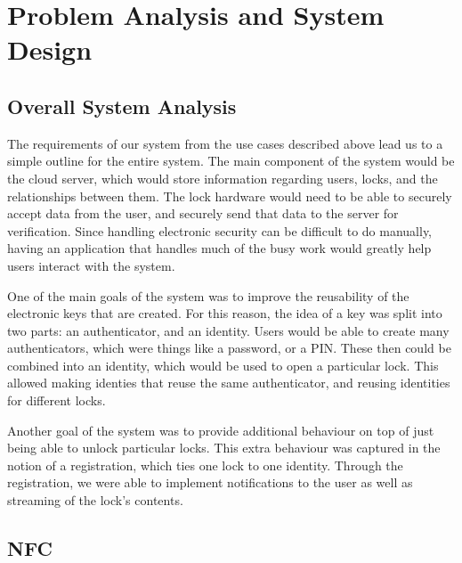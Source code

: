 \documentclass[12pt]{report}
\begin{document}
\chapter{Problem Analysis and System Design}


\section{Overall System Analysis}

The requirements of our system from the use cases described above lead us to a simple outline for the entire system.
The main component of the system would be the cloud server, which would store information regarding users, locks, and
the relationships between them. The lock hardware would need to be able to securely accept data from the user, and
securely send that data to the server for verification. Since handling electronic security can be difficult to do
manually, having an application that handles much of the busy work would greatly help users interact with the system.

One of the main goals of the system was to improve the reusability of the electronic keys that are created. For this
reason, the idea of a key was split into two parts: an authenticator, and an identity. Users would be able to create
many authenticators, which were things like a password, or a PIN. These then could be combined into an identity, which
would be used to open a particular lock. This allowed making identies that reuse the same authenticator, and reusing
identities for different locks.

Another goal of the system was to provide additional behaviour on top of just being able to unlock particular locks.
This extra behaviour was captured in the notion of a registration, which ties one lock to one identity. Through the
registration, we were able to implement notifications to the user as well as streaming of the lock's contents.



\section{NFC}
\end{document}
